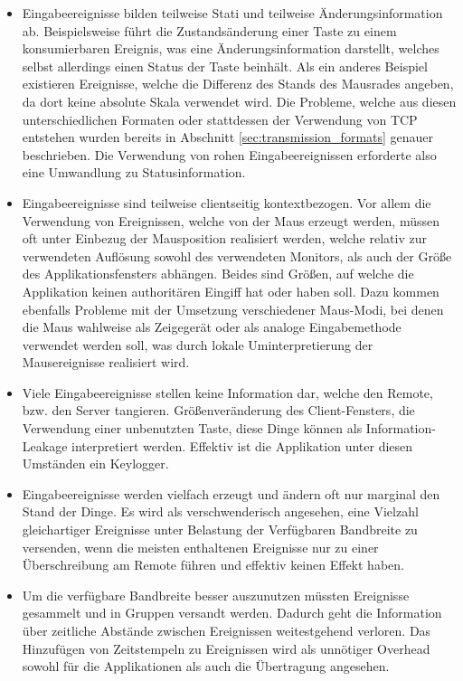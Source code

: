\begin{itemize}
\item Eingabeereignisse bilden teilweise Stati und teilweise Änderungsinformation ab. Beispielsweise führt die Zustandsänderung einer Taste zu einem konsumierbaren Ereignis, was eine Änderungsinformation darstellt, welches selbst allerdings einen Status der Taste beinhält. Als ein anderes Beispiel existieren Ereignisse, welche die Differenz des Stands des Mausrades angeben, da dort keine absolute Skala verwendet wird. Die Probleme, welche aus diesen unterschiedlichen Formaten oder stattdessen der Verwendung von TCP entstehen wurden bereits in Abschnitt \ref{sec:transmission_formats} genauer beschrieben. Die Verwendung von rohen Eingabeereignissen erforderte also eine Umwandlung zu Statusinformation.
\item Eingabeereignisse sind teilweise clientseitig kontextbezogen. Vor allem die Verwendung von Ereignissen, welche von der Maus erzeugt werden, müssen oft unter Einbezug der Mausposition realisiert werden, welche relativ zur verwendeten Auflösung sowohl des verwendeten Monitors, als auch der Größe des Applikationsfensters abhängen. Beides sind Größen, auf welche die Applikation keinen authoritären Eingiff hat oder haben soll. Dazu kommen ebenfalls Probleme mit der Umsetzung verschiedener Maus-Modi, bei denen die Maus wahlweise als Zeigegerät oder als analoge Eingabemethode verwendet werden soll, was durch lokale Uminterpretierung der Mausereignisse realisiert wird.
\item Viele Eingabeereignisse stellen keine Information dar, welche den Remote, bzw. den Server tangieren. Größenveränderung des Client-Fensters, die Verwendung einer unbenutzten Taste, diese Dinge können als Information-Leakage interpretiert werden. Effektiv ist die Applikation unter diesen Umständen ein Keylogger.
\item Eingabeereignisse werden vielfach erzeugt und ändern oft nur marginal den Stand der Dinge. Es wird als verschwenderisch angesehen, eine Vielzahl gleichartiger Ereignisse unter Belastung der Verfügbaren Bandbreite zu versenden, wenn die meisten enthaltenen Ereignisse nur zu einer Überschreibung am Remote führen und effektiv keinen Effekt haben.
\item Um die verfügbare Bandbreite besser auszunutzen müssten Ereignisse gesammelt und in Gruppen versandt werden. Dadurch geht die Information über zeitliche Abstände zwischen Ereignissen weitestgehend verloren. Das Hinzufügen von Zeitstempeln zu Ereignissen wird als unnötiger Overhead sowohl für die Applikationen als auch die Übertragung angesehen.
\end{itemize}

